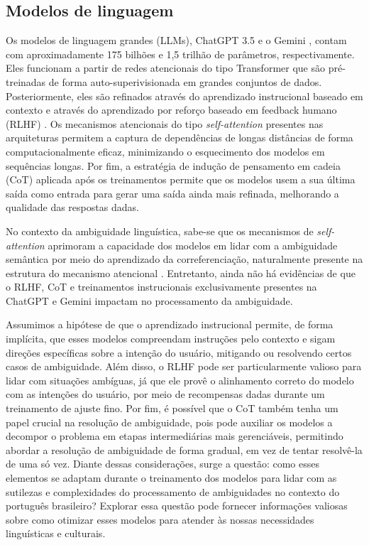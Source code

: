 \subsection{Modelos de linguagem}\label{sec-modelos-linguagem}

Os modelos de linguagem grandes (LLMs), ChatGPT 3.5 \cite{openai2023gpt4} e o Gemini \cite{ahmed2023chatgpt}, contam com aproximadamente 175 bilhões e 1,5 trilhão de parâmetros, respectivamente. Eles funcionam a partir de redes atencionais do tipo Transformer \cite{vaswani2017attention} que são pré-treinadas de forma auto-superivisionada em grandes conjuntos de dados. Posteriormente, eles são refinados através do aprendizado instrucional baseado em contexto e através do aprendizado por reforço baseado em feedback humano (RLHF) \cite{ouyang2022training}. Os mecanismos atencionais do tipo \textit{self-attention} \cite{vaswani2017attention} presentes nas arquiteturas permitem a captura de dependências de longas distâncias de forma computacionalmente eficaz, minimizando o esquecimento dos modelos em sequências longas. Por fim, a estratégia de indução de pensamento em cadeia (CoT) \cite{wei2023chainofthought} aplicada após os treinamentos permite que os modelos usem a sua última saída como entrada para gerar uma saída ainda mais refinada, melhorando a qualidade das respostas dadas.


No contexto da ambiguidade linguística, sabe-se que os mecanismos de \textit{self-attention} aprimoram a capacidade dos modelos em lidar com a ambiguidade semântica por meio do aprendizado da correferenciação, naturalmente presente na estrutura do mecanismo atencional \cite{ortega2023linguistic}. Entretanto, ainda não há evidências de que o RLHF, CoT e treinamentos instrucionais exclusivamente  presentes na ChatGPT e Gemini impactam no processamento da ambiguidade.

Assumimos a hipótese de que o aprendizado instrucional permite, de forma implícita, que esses modelos compreendam instruções pelo contexto e sigam direções específicas sobre a intenção do usuário, mitigando ou resolvendo certos casos de ambiguidade. Além disso, o RLHF pode ser particularmente valioso para lidar com situações ambíguas, já que ele provê o alinhamento correto do modelo com as intenções do usuário, por meio de recompensas dadas durante um treinamento de ajuste fino. Por fim, é possível que o CoT também tenha um papel crucial na resolução de ambiguidade, pois pode auxiliar os modelos a decompor o problema em etapas intermediárias mais gerenciáveis, permitindo abordar a resolução de ambiguidade de forma gradual, em vez de tentar resolvê-la de uma só vez. Diante dessas considerações, surge a questão: como esses elementos se adaptam durante o treinamento dos modelos para lidar com as sutilezas e complexidades do processamento de ambiguidades no contexto do português brasileiro? Explorar essa questão pode fornecer informações valiosas sobre como otimizar esses modelos para atender às nossas necessidades linguísticas e culturais.